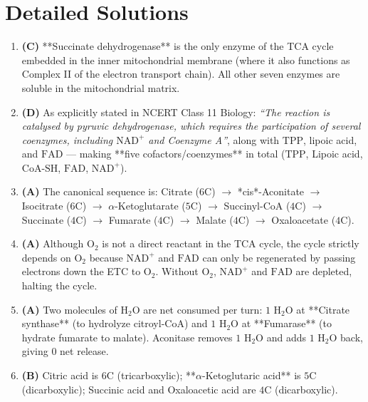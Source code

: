\documentclass[11pt, a4paper]{article}
\begin{document}
\section*{Detailed Solutions}

\begin{enumerate}[label=\textbf{\arabic*.}]

\item \textbf{(C)} **Succinate dehydrogenase** is the only enzyme of the TCA cycle embedded in the inner mitochondrial membrane (where it also functions as Complex II of the electron transport chain). All other seven enzymes are soluble in the mitochondrial matrix.

\item \textbf{(D)} As explicitly stated in NCERT Class 11 Biology: \textit{``The reaction is catalysed by pyruvic dehydrogenase, which requires the participation of several coenzymes, including $\text{NAD}^+$ and Coenzyme A''}, along with $\text{TPP}$, lipoic acid, and $\text{FAD}$ — making **five cofactors/coenzymes** in total ($\text{TPP}$, Lipoic acid, $\text{CoA-SH}$, $\text{FAD}$, $\text{NAD}^+$).

\item \textbf{(A)} The canonical sequence is: Citrate ($6\text{C}$) $\rightarrow$ *cis*-Aconitate $\rightarrow$ Isocitrate ($6\text{C}$) $\rightarrow$ $\alpha$-Ketoglutarate ($5\text{C}$) $\rightarrow$ Succinyl-CoA ($4\text{C}$) $\rightarrow$ Succinate ($4\text{C}$) $\rightarrow$ Fumarate ($4\text{C}$) $\rightarrow$ Malate ($4\text{C}$) $\rightarrow$ Oxaloacetate ($4\text{C}$).

\item \textbf{(A)} Although $\text{O}_2$ is not a direct reactant in the TCA cycle, the cycle strictly depends on $\text{O}_2$ because $\text{NAD}^+$ and $\text{FAD}$ can only be regenerated by passing electrons down the ETC to $\text{O}_2$. Without $\text{O}_2$, $\text{NAD}^+$ and $\text{FAD}$ are depleted, halting the cycle.

\item \textbf{(A)} Two molecules of $\text{H}_2\text{O}$ are net consumed per turn: $1\text{ H}_2\text{O}$ at **Citrate synthase** (to hydrolyze citroyl-CoA) and $1\text{ H}_2\text{O}$ at **Fumarase** (to hydrate fumarate to malate). Aconitase removes $1\text{ H}_2\text{O}$ and adds $1\text{ H}_2\text{O}$ back, giving $0$ net release.

\item \textbf{(B)} Citric acid is $6\text{C}$ (tricarboxylic); **$\alpha$-Ketoglutaric acid** is $5\text{C}$ (dicarboxylic); Succinic acid and Oxaloacetic acid are $4\text{C}$ (dicarboxylic).


\end{enumerate}
\end{document}
